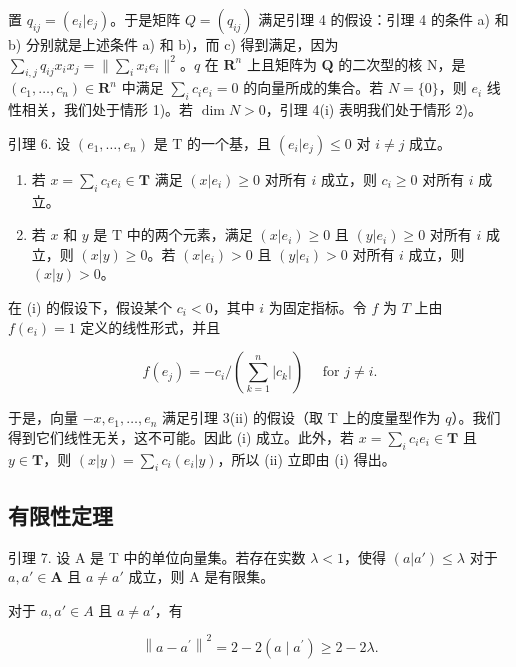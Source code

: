置 \(q_{ij} = (e_i|e_j)\)。于是矩阵 \(Q = (q_{ij})\) 满足引理 4 的假设：引理 4 的条件 a) 和 b) 分别就是上述条件 a) 和 b)，而 c) 得到满足，因为 \(\sum_{i,j} q_{ij} x_i x_j = \|\sum_{i} x_i e_i\|^2\)。\(q\) 在 \(\mathbf{R}^n\) 上且矩阵为 \(\mathbf{Q}\) 的二次型的核 N，是 \((c_1, \ldots, c_n) \in \mathbf{R}^n\) 中满足 \(\sum_{i} c_i e_i = 0\) 的向量所成的集合。若 \(N = \{0\}\)，则 \(e_i\) 线性相关，我们处于情形 1)。若 \(\dim N > 0\)，引理 4(i) 表明我们处于情形 2)。

引理 6. 设 \((e_1, \ldots, e_n)\) 是 T 的一个基，且 \((e_i | e_j) \leqslant 0\) 对 \(i \neq j\) 成立。

\begin{enumerate}
\def\labelenumi{(\roman{enumi})}
\item
若 \(x = \sum_{i} c_i e_i \in \mathbf{T}\) 满足 \((x|e_i) \geqslant 0\) 对所有 \(i\) 成立，则 \(c_i \geqslant 0\) 对所有 \(i\) 成立。
\item
若 \(x\) 和 \(y\) 是 \(\mathrm{T}\) 中的两个元素，满足 \((x|e_i) \geqslant 0\) 且 \((y|e_i) \geqslant 0\) 对所有 \(i\) 成立，则 \((x|y) \geqslant 0\)。若 \((x|e_i) > 0\) 且 \((y|e_i) > 0\) 对所有 \(i\) 成立，则 \((x|y) > 0\)。
\end{enumerate}

在 (i) 的假设下，假设某个 \(c_{i} < 0\)，其中 \(i\) 为固定指标。令 \(f\) 为 \(T\) 上由 \(f(e_{i}) = 1\) 定义的线性形式，并且

\[
f \left(e _ {j}\right) = - c _ {i} / \left(\sum_ {k = 1} ^ {n} \left| c _ {k} \right|\right) \quad \text { for } j \neq i.
\]

于是，向量 \(-x, e_1, \ldots, e_n\) 满足引理 3(ii) 的假设（取 T 上的度量型作为 \(q\)）。我们得到它们线性无关，这不可能。因此 (i) 成立。此外，若 \(x = \sum_{i} c_i e_i \in \mathbf{T}\) 且 \(y \in \mathbf{T}\)，则 \((x|y) = \sum_{i} c_i (e_i | y)\)，所以 (ii) 立即由 (i) 得出。

\subsection{有限性定理}

引理 7. 设 A 是 T 中的单位向量集。若存在实数 \(\lambda < 1\)，使得 \((a|a') \leqslant \lambda\) 对于 \(a, a' \in \mathbf{A}\) 且 \(a \neq a'\) 成立，则 A 是有限集。

对于 \(a, a' \in A\) 且 \(a \neq a'\)，有

\[
\left\| a - a ^ {\prime} \right\| ^ {2} = 2 - 2 (a \mid a ^ {\prime}) \geqslant 2 - 2 \lambda .
\]

